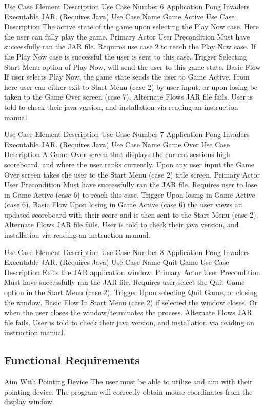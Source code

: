 \documentclass[12pt, titlepage]{article}
\begin{document}
Use Case Element
Description
Use Case Number
6
Application
Pong Invaders Executable JAR. (Requires Java)
Use Case Name
Game Active
Use Case Description
The active state of the game upon selecting the Play Now case. Here the user can fully play the game.
Primary Actor
User 
Precondition
Must have successfully ran the JAR file. Requires use case 2 to reach the Play Now case. If the Play Now case is successful the user is sent to this case.
Trigger
Selecting Start Menu option of Play Now, will send the user to this game state.
Basic Flow
If user selects Play Now, the game state sends the user to Game Active. From here user can either exit to Start Menu (case 2) by user input, or upon losing be taken to the Game Over screen (case 7).
Alternate Flows
JAR file fails. User is told to check their java version, and installation via reading an instruction manual.



Use Case Element
Description
Use Case Number
7
Application
Pong Invaders Executable JAR. (Requires Java)
Use Case Name
Game Over
Use Case Description
A Game Over screen that displays the current sessions high scoreboard, and where the user ranks currently. Upon any user input the Game Over screen takes the user to the Start Menu (case 2) title screen.
Primary Actor
User 
Precondition
Must have successfully ran the JAR file. Requires user to lose in Game Active (case 6) to reach this case.
Trigger
Upon losing in Game Active (case 6).
Basic Flow
Upon losing in Game Active (case 6) the user views an updated scoreboard with their score and is then sent to the Start Menu (case 2).
Alternate Flows
JAR file fails. User is told to check their java version, and installation via reading an instruction manual.


Use Case Element
Description
Use Case Number
8
Application
Pong Invaders Executable JAR. (Requires Java)
Use Case Name
Quit Game
Use Case Description
Exits the JAR application window.
Primary Actor
User 
Precondition
Must have successfully ran the JAR file. Requires user select the Quit Game option in the Start Menu (case 2).
Trigger
Upon selecting Quit Game, or closing the window.
Basic Flow
In Start Menu (case 2) if selected the window closes. Or when the user closes the window/terminates the process.
Alternate Flows
JAR file fails. User is told to check their java version, and installation via reading an instruction manual.

\subsection{Functional Requirements}
Aim With Pointing Device
The user must be able to utilize and aim with their pointing device. The program will correctly obtain mouse coordinates from the display window.
\end{document}
